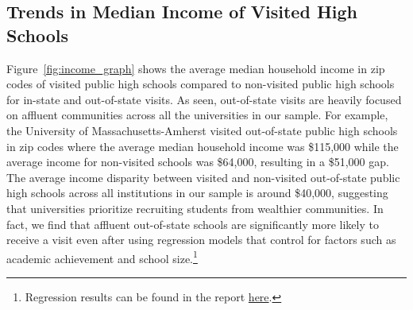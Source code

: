 \documentclass{article}
\begin{document}
\subsection*{Trends in Median Income of Visited High Schools}

Figure~\ref{fig:income_graph} shows the average median household income in zip codes of visited public high schools compared to non-visited public high schools for in-state and out-of-state visits. As seen, out-of-state visits are heavily focused on affluent communities across all the universities in our sample. For example, the University of Massachusetts-Amherst visited out-of-state public high schools in zip codes where the average median household income was \$115,000 while the average income for non-visited schools was \$64,000, resulting in a \$51,000 gap. The average income disparity between visited and non-visited out-of-state public high schools across all institutions in our sample is around \$40,000, suggesting that universities prioritize recruiting students from wealthier communities. In fact, we find that affluent out-of-state schools are significantly more likely to receive a visit even after using regression models that control for factors such as academic achievement and school size.\footnote{Regression results can be found in the report \href{https://emraresearch.org/sites/default/files/2019-03/joyce_report.pdf\#page=27}{here}.}
\end{document}
